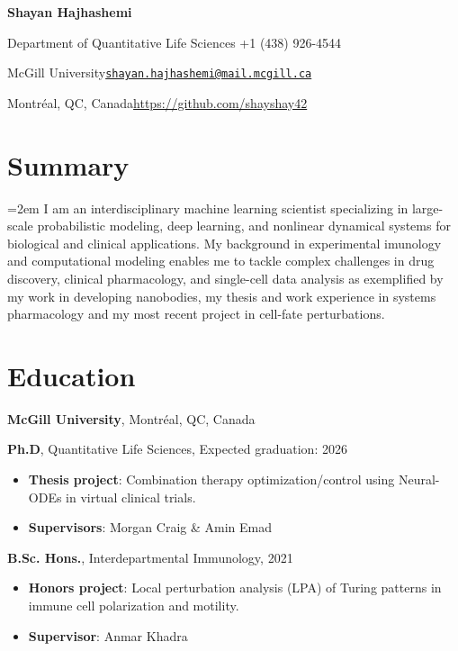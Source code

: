 \documentclass{article}
\newcommand{\cvsection}[1]{\section*{\rmfamily#1}}
\begin{document}
\begin{center}
    \Huge{
    \rmfamily
    \textbf{Shayan Hajhashemi}}
\end{center}
\vspace{20pt}



\setlength{\parskip}{1pt}
\renewcommand{\arraystretch}{1.25}


\noindent Department of Quantitative Life Sciences \hfill +1 (438) 926-4544

\noindent McGill University\hfill \href{mailto:shayan.hajhashemi@mail.mcgill.ca}{\texttt{shayan.hajhashemi@mail.mcgill.ca}}

\noindent Montréal, QC, Canada\hfill \url{https://github.com/shayshay42}


\setlength{\parskip}{1pt}




\cvsection{Summary}
\indent

\hangindent=2em I am an interdisciplinary machine learning scientist specializing in large-scale probabilistic modeling, deep
learning, and nonlinear dynamical systems for biological and clinical applications. My background in experimental imunology and computational modeling enables me to tackle complex challenges in drug discovery, clinical
pharmacology, and single-cell data analysis as exemplified by my work in developing nanobodies, my thesis and work experience in systems pharmacology and my most recent project in cell-fate perturbations.

\cvsection{Education}
\indent

\textbf{McGill University}, Montréal, QC, Canada

\hspace{1em} \textbf{Ph.D}, Quantitative Life Sciences, \hfill  Expected graduation: 2026
\begin{itemize}[leftmargin=4em, itemsep=0pt]
    \item[] \textbf{Thesis project}: Combination therapy optimization/control using Neural-ODEs in virtual clinical trials.
    \item[] \textbf{Supervisors}: Morgan Craig \& Amin Emad
\end{itemize}
\vspace{3pt}

\hspace{1em} \textbf{B.Sc. Hons.}, Interdepartmental Immunology, \hfill 2021
\begin{itemize}[leftmargin=4em, itemsep=0pt]
    \item[] \textbf{Honors project}: Local perturbation analysis (LPA) of Turing patterns in immune cell polarization and motility.
    \item[] \textbf{Supervisor}: Anmar Khadra
\end{itemize}
\end{document}
